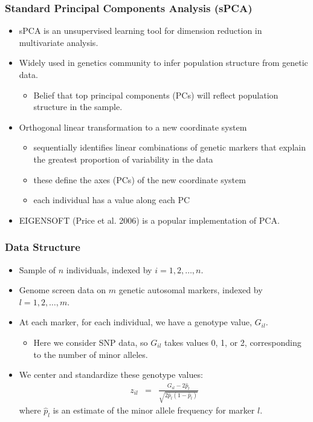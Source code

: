 \documentclass{beamer}
\begin{document}
\begin{frame}
	\frametitle{\bf Standard Principal Components Analysis (sPCA)}
	\begin{itemize}
		\item sPCA is an unsupervised learning tool for dimension reduction in multivariate analysis.
		\item Widely used in genetics community to infer population structure from genetic data.
		\begin{itemize}
			\item Belief that top principal components (PCs) will reflect population structure in the sample.
		\end{itemize}
		\item Orthogonal linear transformation to a new coordinate system
		\begin{itemize}
			\item sequentially identifies linear
			combinations of genetic markers that explain the
			greatest proportion of variability in the data
			\item these define the axes (PCs) of the new coordinate system
			\item each individual has a value along each PC
		\end{itemize}
		\item EIGENSOFT (Price et al. 2006) is a popular implementation of PCA.
	\end{itemize}
\end{frame}

\begin{frame}
	\frametitle{\bf Data Structure}
	\begin{itemize}
		\item Sample of $n$ individuals, indexed by $i = 1,2,\hdots,n$.
		\item Genome screen data on $m$ genetic autosomal markers, indexed by $l =
		1,2,\hdots,m$.
		\item At each marker, for each individual, we have a genotype value,
		$G_{il}$.
		\begin{itemize}
		\item Here we consider SNP data, so $G_{il}$ takes values 0, 1,
		or 2, corresponding to the number of minor alleles.
	\end{itemize}
		\item We center and standardize these genotype values:
		\begin{eqnarray*}
			z_{il} &=& \frac{G_{il} - 2\hat{p}_l}{\sqrt{2\hat{p}_l(1-\hat{p}_l)}}
		\end{eqnarray*}
		where $\hat{p}_l$ is an estimate of the minor allele frequency for marker $l$.
	\end{itemize}
\end{frame}
\end{document}
